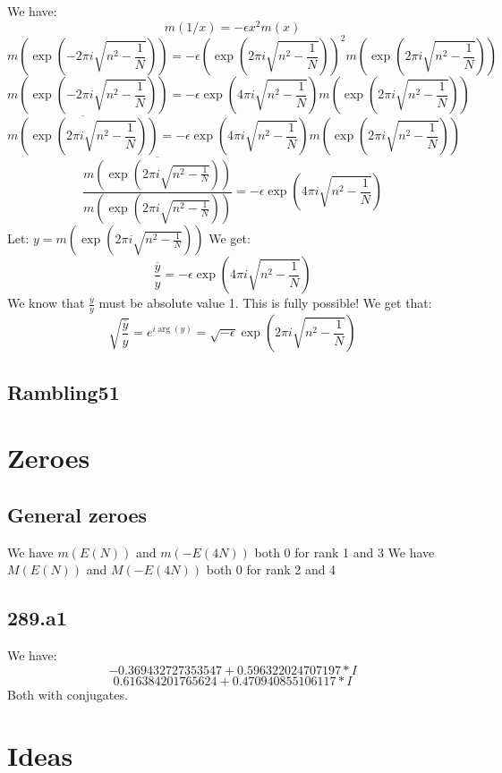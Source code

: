 \documentclass[a4paper]{amsart}
\begin{document}
We have:
$$m(1/x) = -\epsilon x^2m(x)$$
$$m(\exp(-2\pi i\sqrt{n^2 - \frac{1}{N}})) = -\epsilon (\exp(2\pi i\sqrt{n^2 - \frac{1}{N}}))^2m(\exp(2\pi i\sqrt{n^2 - \frac{1}{N}}))$$
$$m(\exp(-2\pi i\sqrt{n^2 - \frac{1}{N}})) = -\epsilon \exp(4\pi i\sqrt{n^2 - \frac{1}{N}})m(\exp(2\pi i\sqrt{n^2 - \frac{1}{N}}))$$
$$\overline{m(\exp(2\pi i\sqrt{n^2 - \frac{1}{N}}))} = -\epsilon \exp(4\pi i\sqrt{n^2 - \frac{1}{N}})m(\exp(2\pi i\sqrt{n^2 - \frac{1}{N}}))$$
$$\frac{\overline{m(\exp(2\pi i\sqrt{n^2 - \frac{1}{N}}))}}{m(\exp(2\pi i\sqrt{n^2 - \frac{1}{N}}))} = -\epsilon \exp(4\pi i\sqrt{n^2 - \frac{1}{N}})$$
Let: 
$y = m(\exp(2\pi i\sqrt{n^2 - \frac{1}{N}}))$
We get:
$$\frac{\overline{y}}{y} = -\epsilon \exp(4\pi i\sqrt{n^2 - \frac{1}{N}})$$
We know that $\frac{\overline{y}}{y}$ must be absolute value 1.
This is fully possible! We get that:
$$\sqrt{\frac{\overline{y}}{y}} = e^{i \arg(y)} = \sqrt{-\epsilon} \exp(2\pi i\sqrt{n^2 - \frac{1}{N}})$$


\subsection{Rambling51}






\section{Zeroes}

\subsection{General zeroes}

We have $m(E(N))$ and $m(-E(4N))$ both $0$ for rank 1 and 3
We have $M(E(N))$ and $M(-E(4N))$ both $0$ for rank 2 and 4

\subsection{289.a1}

We have:
$$-0.369432727353547 + 0.596322024707197*I$$
$$0.616384201765624 + 0.470940855106117*I$$
Both with conjugates.

\section{Ideas}
\end{document}
